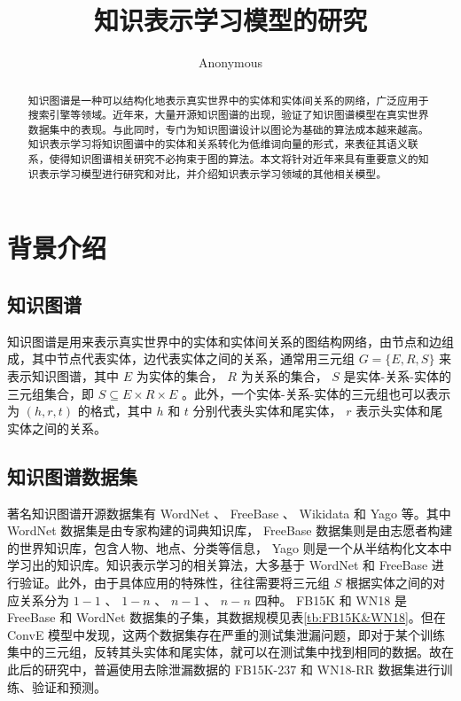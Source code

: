 \documentclass{llncs}
\begin{document}
\title{知识表示学习模型的研究}
\author{Anonymous}
\maketitle

\begin{abstract}

知识图谱是一种可以结构化地表示真实世界中的实体和实体间关系的网络，广泛应用于搜索引擎等领域。近年来，大量开源知识图谱的出现，验证了知识图谱模型在真实世界数据集中的表现。与此同时，专门为知识图谱设计以图论为基础的算法成本越来越高。知识表示学习将知识图谱中的实体和关系转化为低维词向量的形式，来表征其语义联系，使得知识图谱相关研究不必拘束于图的算法。本文将针对近年来具有重要意义的知识表示学习模型进行研究和对比，并介绍知识表示学习领域的其他相关模型。


\end{abstract}

\section{背景介绍}

\subsection{知识图谱}

知识图谱\cite{DBLP:journals/pieee/Nickel0TG16}是用来表示真实世界中的实体和实体间关系的图结构网络，由节点和边组成，其中节点代表实体，边代表实体之间的关系，通常用三元组 $G=\{E,R,S\}$ 来表示知识图谱，其中 $E$ 为实体的集合， $R$ 为关系的集合， $S$ 是实体-关系-实体的三元组集合，即 $S\subseteq{E×R×E}$ 。此外，一个实体-关系-实体的三元组也可以表示为 $(h,r,t)$ 的格式，其中 $h$ 和 $t$ 分别代表头实体和尾实体， $r$ 表示头实体和尾实体之间的关系。

\subsection{知识图谱数据集}

著名知识图谱开源数据集有 WordNet\cite{Miller:1995:WLD:219717.219748} 、 FreeBase\cite{Bollacker:2008:FCC:1376616.1376746} 、 Wikidata\cite{42240} 和 Yago\cite{suchanek2007yago} 等。其中 WordNet 数据集是由专家构建的词典知识库， FreeBase 数据集则是由志愿者构建的世界知识库，包含人物、地点、分类等信息， Yago 则是一个从半结构化文本中学习出的知识库。知识表示学习的相关算法，大多基于 WordNet 和 FreeBase 进行验证。此外，由于具体应用的特殊性，往往需要将三元组 $S$ 根据实体之间的对应关系分为 $1-1$ 、 $1-n$ 、 $n-1$ 、 $n-n$ 四种。 FB15K 和 WN18 \cite{DBLP:conf/nips/BordesUGWY13}是 FreeBase 和 WordNet 数据集的子集，其数据规模见表\ref{tb:FB15K&WN18}。但在 ConvE 模型\cite{DBLP:conf/aaai/DettmersMS018}中发现，这两个数据集存在严重的测试集泄漏问题，即对于某个训练集中的三元组，反转其头实体和尾实体，就可以在测试集中找到相同的数据。故在此后的研究中，普遍使用去除泄漏数据的 FB15K-237 和 WN18-RR 数据集进行训练、验证和预测。
\end{document}
